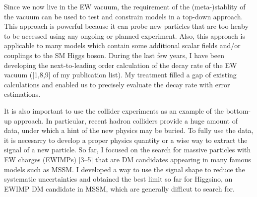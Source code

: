 \documentclass[12pt,notitlepage]{article}
\begin{document}
Since we now live in the EW vacuum, the requirement of the (meta-)stablity of the vacuum can be used to test and constrain models in a top-down approach.
This approach is powerful because it can probe new particles that are too heaby to be accessed using any ongoing or planned experiment.
Also, this approach is applicable to many models which contain some additional scalar fields and/or couplings to the SM Higgs boson.
During the last few years, I have been developing the next-to-leading order calculation of the decay rate of the EW vacuum ([1,8,9] of my publication list).
My treatment filled a gap of existing calculations and enabled us to precisely evaluate the decay rate with error estimations.

It is also important to use the collider experiments as an example of the bottom-up approach.
In particular, recent hadron colliders provide a huge amount of data, under which a hint of the new physics may be buried.
To fully use the data, it is necesarry to develop a proper physics quantity or a wise way to extract the signal of a new particle.
So far, I focused on the search for massive particles with EW charges (EWIMPs) [3--5] that are DM candidates appearing in many famous models such as MSSM.
I developed a way to use the signal shape to reduce the systematic uncertainties and obtained the best limit so far for Higgsino, an EWIMP DM candidate in MSSM, which are generally difficut to search for.
\end{document}
